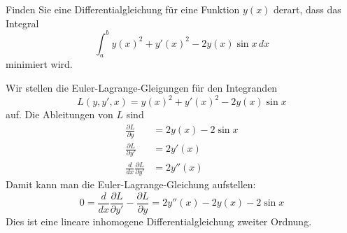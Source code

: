 Finden Sie eine Differentialgleichung für eine Funktion $y(x)$ derart,
dass das Integral
\[
\int_a^b
y(x)^2 + y'(x)^2 -2y(x)\sin x
\,dx
\]
minimiert wird.

\begin{loesung}
Wir stellen die Euler-Lagrange-Gleigungen für den Integranden
\[
L(y,y',x)= y(x)^2 + y'(x)^2 -2y(x)\sin x
\]
auf.
Die Ableitungen von $L$ sind
\begin{align*}
\frac{\partial L}{\partial y}
&=
2y(x)-2\sin x
\\
\frac{\partial L}{\partial y'}
&=
2y'(x)
\\
\frac{d}{dx}
\frac{\partial L}{\partial y'}
&=
2y''(x)
\end{align*}
Damit kann man die Euler-Lagrange-Gleichung aufstellen:
\[
0
=
\frac{d}{dx}\frac{\partial L}{\partial y'} - \frac{\partial L}{\partial y}
=
2y''(x)
-
2y(x)-2\sin x
\]
Dies ist eine lineare inhomogene Differentialgleichung zweiter Ordnung.
\end{loesung}

